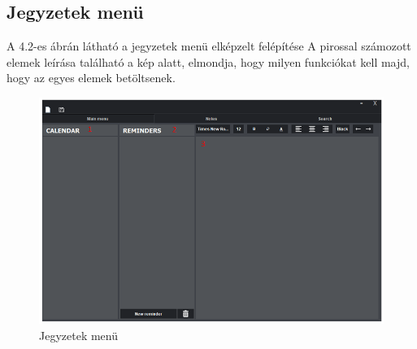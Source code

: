 \subsection{Jegyzetek menü}

A 4.2-es ábrán látható a jegyzetek menü elképzelt felépítése A pirossal számozott elemek leírása található a kép alatt, elmondja, hogy milyen funkciókat kell majd, hogy az egyes elemek betöltsenek.

\begin{figure}[h]
	\centering
	\includegraphics[scale=0.5]{images/menu_2.png}
	\caption{Jegyzetek menü}
	\label{fig:menu_notes}
\end{figure}


